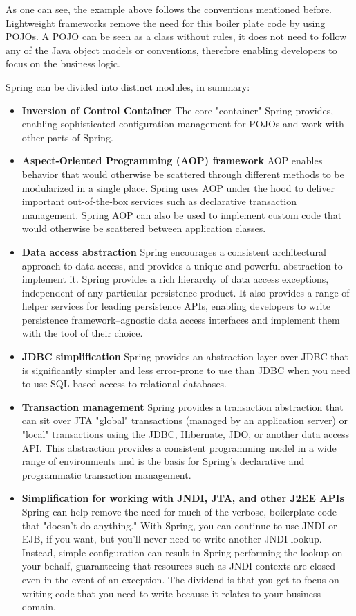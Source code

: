 As one can see, the example above follows the conventions mentioned before. Lightweight frameworks remove the need for this boiler plate code by using POJOs. A POJO can be seen as a class without rules, it does not need to follow any of the Java object models or conventions, therefore enabling developers to focus on the business logic.

Spring can be divided into distinct modules, in summary:

\begin{review}
\begin{itemize}
	\item \textbf{Inversion of Control Container} The core "container" Spring provides, enabling sophisticated configuration management for POJOs and work with other parts of Spring.
	\item \textbf{Aspect-Oriented Programming (AOP) framework} AOP enables behavior that would otherwise be scattered through different methods to be modularized in a single place. Spring uses AOP under the hood to deliver important out-of-the-box services such as declarative transaction management. Spring AOP can also be used to implement custom code that would otherwise be scattered between application classes.
	\item \textbf{Data access abstraction} Spring encourages a consistent architectural approach to data access, and provides a unique and powerful abstraction to implement it. Spring provides a rich hierarchy of data access exceptions, independent of any particular persistence product. It also provides a range of helper services for leading persistence APIs, enabling developers to write persistence framework–agnostic data access interfaces and implement them with the tool of their choice.
	\item \textbf{JDBC simplification} Spring provides an abstraction layer over JDBC that is significantly simpler and less error-prone to use than JDBC when you need to use SQL-based access to relational databases.
	\item \textbf{Transaction management} Spring provides a transaction abstraction that can sit over JTA "global" transactions (managed by an application server) or "local" transactions using the JDBC, Hibernate, JDO, or another data access API. This abstraction provides a consistent programming model in a wide range of environments and is the basis for Spring's declarative and programmatic transaction management.
	\item \textbf{Simplification for working with JNDI, JTA, and other J2EE APIs} Spring can help remove the need for much of the verbose, boilerplate code that "doesn't do anything." With Spring, you can continue to use JNDI or EJB, if you want, but you'll never need to write another JNDI lookup. Instead, simple configuration can result in Spring performing the lookup on your behalf, guaranteeing that resources such as JNDI contexts are closed even in the event of an exception. The dividend is that you get to focus on writing code that you need to write because it relates to your business domain.

\end{itemize}
\end{review}

